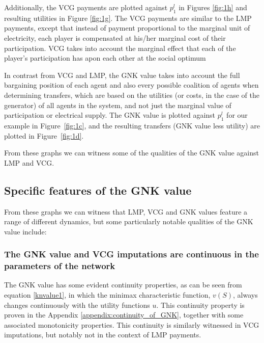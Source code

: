 Additionally, the VCG payments are plotted against $p_1^l$ in Figures \ref{fig:1h} and resulting utilities in Figure \ref{fig:1g}.
The VCG payments are similar to the LMP payments, except that instead of payment proportional to the marginal unit of electricity, each player is compensated at his/her marginal cost of their participation.
VCG takes into account the marginal effect that each of the player's participation has apon each other at the social optimum

In contrast from VCG and LMP, the GNK value takes into account the full bargaining position of each agent and also every possible coalition of agents when determining transfers, which are based on the utilities (or costs, in the case of the generator) of all agents in the system, and not just the marginal value of participation or electrical supply.
The GNK value is plotted against $p_1^l$ for our example in Figure~\ref{fig:1c}, and the resulting transfers (GNK value less utility) are plotted in Figure~\ref{fig:1d}.

From these graphs we can witness some of the qualities of the GNK value against LMP and VCG.

\subsection{Specific features of the GNK value}

From these graphs we can witness that LMP, VCG and GNK values feature a range of different dynamics,
but some particularly notable qualities of the GNK value include:


\subsubsection*{The GNK value and VCG imputations are continuous in the parameters of the network}
The GNK value has some evident continuity properties, as can be seen from equation \ref{knvalue1}, in which the minimax characteristic function, $v(S)$, always changes continuously with the utility functions $u$.
This continuity property is proven in the Appendix \ref{appendix:continuity_of_GNK}, together with some associated monotonicity properties.
This continuity is similarly witnessed in VCG imputations, but notably not in the context of LMP payments.

